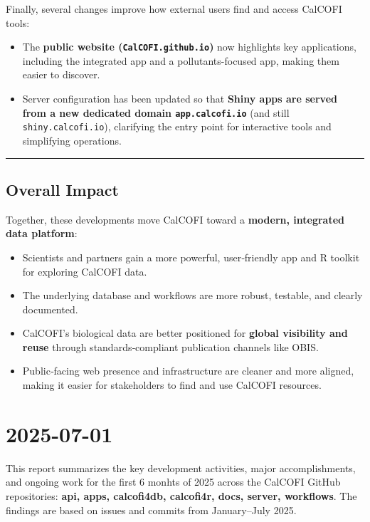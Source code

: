 \documentclass[
  letterpaper,
  DIV=11,
  numbers=noendperiod]{scrreprt}
\providecommand{\tightlist}{%
  \setlength{\itemsep}{0pt}\setlength{\parskip}{0pt}}
\begin{document}
Finally, several changes improve how external users find and access
CalCOFI tools:

\begin{itemize}
\tightlist
\item
  The \textbf{public website (\texttt{CalCOFI.github.io})} now
  highlights key applications, including the integrated app and a
  pollutants-focused app, making them easier to discover.
\item
  Server configuration has been updated so that \textbf{Shiny apps are
  served from a new dedicated domain \texttt{app.calcofi.io}} (and still
  \texttt{shiny.calcofi.io}), clarifying the entry point for interactive
  tools and simplifying operations.
\end{itemize}

\begin{center}\rule{0.5\linewidth}{0.5pt}\end{center}

\subsection{Overall Impact}\label{overall-impact}

Together, these developments move CalCOFI toward a \textbf{modern,
integrated data platform}:

\begin{itemize}
\tightlist
\item
  Scientists and partners gain a more powerful, user‑friendly app and R
  toolkit for exploring CalCOFI data.
\item
  The underlying database and workflows are more robust, testable, and
  clearly documented.
\item
  CalCOFI's biological data are better positioned for \textbf{global
  visibility and reuse} through standards‑compliant publication channels
  like OBIS.
\item
  Public‑facing web presence and infrastructure are cleaner and more
  aligned, making it easier for stakeholders to find and use CalCOFI
  resources.
\end{itemize}

\section{2025-07-01}\label{section-2}

This report summarizes the key development activities, major
accomplishments, and ongoing work for the first 6 monhts of 2025 across
the CalCOFI GitHub repositories: \textbf{api, apps, calcofi4db,
calcofi4r, docs, server, workflows}. The findings are based on issues
and commits from January--July 2025.
\end{document}
